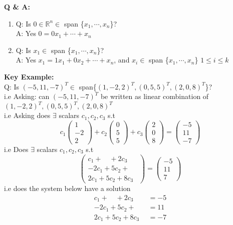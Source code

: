 \documentclass{article}
\theoremstyle{definition}
\theoremstyle{thrm}
\begin{document}
\textbf{Q \& A:}
\begin{enumerate}
	\item Q: Is $0\in \mathbb{R}^n \in$ span \{$x_1,\cdots, x_n$\}?\\A: Yes $0 = 0x_1+\cdots+x_n$
	\item Q: Is $x_1 \in$ span \{$x_1,\cdots, x_n$\}?\\A: Yes $x_1 = 1x_1+0x_2+\cdots+x_n$, and $x_i \in$ span \{$x_1,\cdots, x_n$\} $1\leq i \leq k$
\end{enumerate}

\pagebreak
\textbf{Key Example: }\\
Q:  Is $(-5,11,-7)^T \in $ span\{$(1,-2,2)^T,(0,5,5)^T, (2,0,8)^T$\}?\\
i.e Asking: can $(-5,11,-7)^T$ be written as linear combination of $(1,-2,2)^T,(0,5,5)^T, (2,0,8)^T$ \\
i.e Asking does $\exists$ scalars $c_1, c_2, c_3$ s.t
\begin{equation*}
	c_1\begin{pmatrix}
		1\\-2\\2
	\end{pmatrix}+c_2\begin{pmatrix}
		0\\5\\5
	\end{pmatrix}+c_3\begin{pmatrix}
		2\\0\\8
	\end{pmatrix} = \begin{pmatrix}
		-5\\11\\-7
	\end{pmatrix}
\end{equation*}
i.e Does $\exists$ scalars $c_1, c_2, c_3$ s.t
\begin{equation*}
	\begin{pmatrix}
	c_1+\quad+2c_3\\-2c_1+5c_2+\quad \\2c_1+5c_2+8c_3
	\end{pmatrix} = \begin{pmatrix}
	-5 \\ 11\\ 7
	\end{pmatrix}
\end{equation*}
i.e does the system below have a solution
\begin{align*}
	c_1+\quad+2c_3&=-5\\-2c_1+5c_2+\quad &=11\\2c_1+5c_2+8c_3&=-7
\end{align*}
\end{document}
